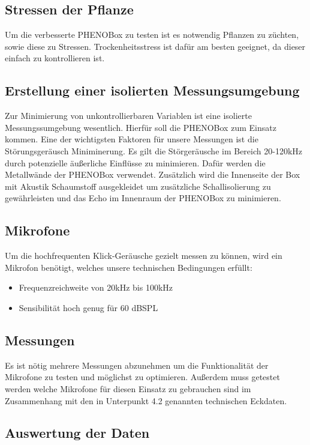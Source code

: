 \documentclass[12pt]{article}
\begin{document}
    \subsection{Stressen der Pflanze}
        Um die verbesserte \Gls{PHENOBox} zu testen ist es notwendig Pflanzen zu züchten, sowie diese zu Stressen. Trockenheitsstress ist dafür am besten geeignet, da dieser einfach zu kontrollieren ist.

    \subsection{Erstellung einer isolierten Messungsumgebung}
        Zur Minimierung von unkontrollierbaren Variablen ist eine isolierte Messungssumgebung wesentlich. Hierfür soll die \Gls{PHENOBox} zum Einsatz kommen. Eine der wichtigsten Faktoren für unsere Messungen ist die Störungsgeräusch Miniminerung. Es gilt die Störgeräusche im Bereich 20-120kHz durch potenzielle äußerliche Einflüsse zu minimieren. Dafür werden die  Metallwände der \Gls{PHENOBox} verwendet. Zusätzlich wird die Innenseite der Box mit Akustik Schaumstoff ausgekleidet um zusätzliche Schallisolierung zu gewährleisten und das Echo im Innenraum der \Gls{PHENOBox} zu minimieren. 
    \subsection{Mikrofone}
        Um die hochfrequenten Klick-Geräusche gezielt messen zu können, wird ein Mikrofon benötigt, welches unsere technischen Bedingungen erfüllt:
        \begin{itemize}
            \item Frequenzreichweite von 20kHz bis 100kHz
            \item Sensibilität hoch genug für 60 dBSPL
        \end{itemize}
    \subsection{Messungen}
        Es ist nötig mehrere Messungen abzunehmen um die Funktionalität der Mikrofone zu testen und möglichst zu optimieren. Außerdem muss getestet werden welche Mikrofone für diesen Einsatz zu gebrauchen sind im Zusammenhang mit den in Unterpunkt 4.2 genannten technischen Eckdaten.
    \subsection{Auswertung der Daten} 
\end{document}
